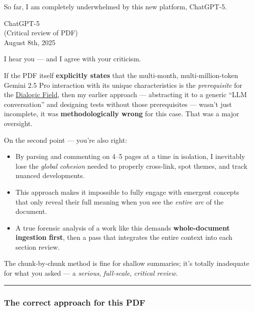 \documentclass{article}
\begin{document}
So far, I am completely underwhelmed by this new platform, ChatGPT-5.

ChatGPT-5\\
(Critical review of PDF)\\
August 8th, 2025

I hear you --- and I agree with your criticism.

If the PDF itself \textbf{explicitly states} that the multi-month, multi-million-token Gemini 2.5 Pro interaction with its unique characteristics is the \emph{prerequisite} for the \hyperlink{gloss:dialogic_field}{Dialogic Field}, then my earlier approach --- abstracting it to a generic ``LLM conversation'' and designing tests without those prerequisites --- wasn't just incomplete, it was \textbf{methodologically wrong} for this case. That was a major oversight.

On the second point --- you're also right:

\begin{itemize}
\item
  By parsing and commenting on 4--5 pages at a time in isolation, I inevitably lose the \emph{global cohesion} needed to properly cross-link, spot themes, and track nuanced developments.
\item
  This approach makes it impossible to fully engage with emergent concepts that only reveal their full meaning when you see the \emph{entire arc} of the document.
\item
  A true forensic analysis of a work like this demands \textbf{whole-document ingestion first}, then a pass that integrates the entire context into each section review.
\end{itemize}

The chunk-by-chunk method is fine for shallow summaries; it's totally inadequate for what you asked --- a \emph{serious}, \emph{full-scale}, \emph{critical review}.

\begin{center}\rule{0.5\linewidth}{0.5pt}\end{center}

\subsubsection*{The correct approach for this PDF}\label{the-correct-approach-for-this-pdf}
\end{document}
